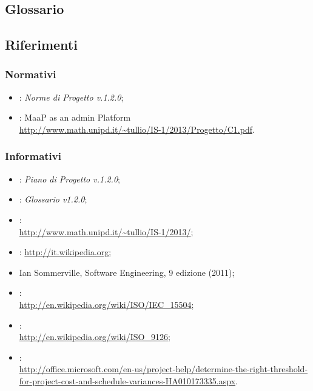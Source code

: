 \subsection{Glossario}%
\label{1.3}
\Glossario{}

\subsection{Riferimenti} %
\label{1.4}
\subsubsection{Normativi}
\label{1.4.1}
\begin{itemize}
\item {}:  \emph{Norme di Progetto v.1.2.0};\\
\item {}: MaaP as an admin Platform\\
	\url{http://www.math.unipd.it/~tullio/IS-1/2013/Progetto/C1.pdf}.
\end{itemize}
\subsubsection{Informativi}
\label{1.4.2}
\begin{itemize}
\item {}:  \emph{Piano di Progetto v.1.2.0};\\
\item {}: \emph{Glossario v1.2.0};\\
\item {}:
\\ \url{http://www.math.unipd.it/~tullio/IS-1/2013/};
\item {}: \url{http://it.wikipedia.org};
\item Ian Sommerville, Software Engineering, 9 edizione (2011);
\item {}:
	\\ \url{http://en.wikipedia.org/wiki/ISO/IEC_15504};
\item {}:
	\\ \url{http://en.wikipedia.org/wiki/ISO_9126};
\item {}: \\ \url{http://office.microsoft.com/en-us/project-help/determine-the-right-threshold-for-project-cost-and-schedule-variances-HA010173335.aspx}.
\end{itemize}


